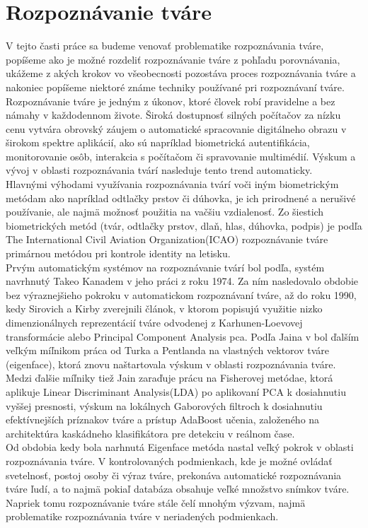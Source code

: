 \section{Rozpoznávanie tváre}
V tejto časti práce sa budeme venovať problematike rozpoznávania tváre, popíšeme ako je možné rozdeliť rozpoznávanie tváre z pohľadu porovnávania,
ukážeme z akých krokov vo všeobecnosti pozostáva proces rozpoznávania tváre a nakoniec popíšeme niektoré známe techniky používané pri rozpoznávaní tváre. \\

\indent Rozpoznávanie tváre je jedným z úkonov, ktoré človek robí pravidelne a bez námahy v každodennom živote.
Široká dostupnosť silných počítačov za nízku cenu vytvára obrovský záujem o automatické spracovanie digitálneho
obrazu v širokom spektre aplikácií, ako sú napríklad biometrická autentifikácia, monitorovanie osôb,
interakcia s počítačom či spravovanie multimédií.
Výskum a vývoj v oblasti rozpoznávania tvárí nasleduje tento trend
automaticky.\\
\indent Hlavnými výhodami využívania rozpoznávania tvárí voči iným biometrickým metódam ako napríklad odtlačky prstov či dúhovka,
je ich prirodnené a nerušivé používanie, ale najmä možnosť použitia na vačšiu vzdialenosť. Zo šiestich biometrických metód (tvár, odtlačky prstov, dlaň, hlas, dúhovka, podpis)
je podľa The International Civil Aviation Organization(ICAO)\cite{icao} rozpoznávanie tváre primárnou metódou pri kontrole identity na letisku.\\
\indent Prvým automatickým systémov na rozpoznávanie tvárí bol podľa\cite{handbookface}, systém navrhnutý Takeo Kanadem v jeho práci\cite{kanade1974} z roku 1974.
Za ním nasledovalo obdobie bez výraznejšieho pokroku v automatickom rozpoznávaní tváre, až do roku 1990, kedy Sirovich a Kirby zverejnili článok\cite{kirby1990application},
v ktorom popisujú využitie nizko dimenzionálnych reprezentácií tváre odvodenej z Karhunen-Loevovej transformácie alebo Principal Component Analysis \acrshort{pca}.
Podľa Jaina v\cite{handbookface} bol ďalším veľkým míľnikom práca\cite{turk1991eigenfaces} od Turka a Pentlanda na vlastných vektorov tváre (eigenface),
ktorá znovu naštartovala výskum v oblasti rozpoznávania tváre. Medzi ďalšie míľniky tiež Jain zaraďuje prácu na Fisherovej metódae\cite{belhumeur1997eigenfaces},
ktorá aplikuje Linear Discriminant Analysis(LDA) po aplikovaní PCA k dosiahnutiu vyššej presnosti, výskum na lokálnych Gaborových filtroch\cite{wiskott1997face}
k dosiahnutiu efektívnejších príznakov tváre a prístup AdaBoost učenia, založeného na architektúra kaskádneho klasifikátora pre detekciu v reálnom čase\cite{viola2001rapid}.\\
\indent Od obdobia kedy bola narhnutá Eigenface metóda nastal veľký pokrok v oblasti rozpoznávania tváre.
V kontrolovaných podmienkach, kde je možné ovládať svetelnosť,
postoj osoby či výraz tváre, prekonáva automatické rozpoznávania tváre ľudí, a to najmä pokiaľ databáza obsahuje veľké množstvo snímkov tváre.
Napriek tomu rozpoznávanie tváre
stále čelí mnohým výzvam, najmä problematike rozpoznávania tváre v neriadených podmienkach.

